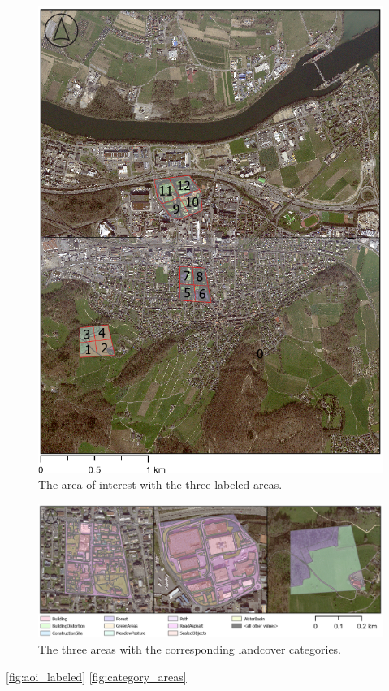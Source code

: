 \begin{figure}[H]
    \centering
    \captionsetup{width=0.8\linewidth}
    \includegraphics[scale=0.6]{figures/AOI_Labeled.png}
    \caption{The area of interest with the three labeled areas.}
    \label{fig:aoi_labeled}
\end{figure}

\begin{figure}[H]
    \centering
    \captionsetup{width=0.8\linewidth}
    \includegraphics[width=\linewidth]{figures/category_areas.png}
    \caption{The three areas with the corresponding landcover categories.}
    \label{fig:category_areas}
\end{figure}

\autoref{fig:aoi_labeled}
\autoref{fig:category_areas}
